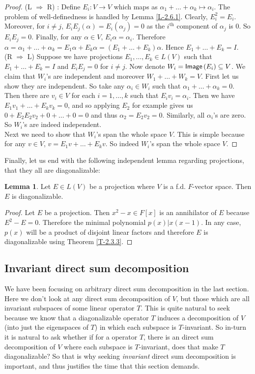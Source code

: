 \documentclass[letterpaper,11pt,twoside]{article}
\theoremstyle{definition}
\theoremstyle{definition}
\theoremstyle{definition}
\theoremstyle{definition}
\newtheorem{lemma}[proposition]{\textbf{Lemma}}
\theoremstyle{definition}
\theoremstyle{definition}
\theoremstyle{remark}
\theoremstyle{definition}
\newcommand{\Image}[1]{{\fontfamily{lmss}\selectfont 
		\text{Image}\left (#1\right )
}}
\begin{document}
    \begin{proof}
    (L $\Rightarrow$ R) : Define $E_i : V\to V$ which maps as $\alpha_1 + \dots + \alpha_k \mapsto \alpha_i$. The problem of well-definedness is handled by Lemma \ref{L-2.6.1}. Clearly, $E_i^2 = E_i$. Moreover, for $i\neq j$, $E_iE_j (\alpha) = E_i(\alpha_j) = 0$ as the $i^\text{th}$ component of $\alpha_j$ is $0$. So $E_iE_j = 0$. Finally, for any $\alpha\in V$, $E_i \alpha = \alpha_i$. Therefore $\alpha = \alpha_1 + \dots + \alpha_k = E_1\alpha + E_k \alpha = (E_1 + \dots + E_k)\alpha$. Hence $E_1 + \dots +E_k = I$.\\
    
    (R $\Rightarrow$ L) Suppose we have projections $E_1,\dots, E_k\in L(V)$ such that $E_1 + \dots +E_k = I$ and $E_iE_j = 0$ for $i\neq j$. Now denote $W_i = \Image{E_i} \subseteq V$. We claim that $W_i$'s are independent and moreover $W_1 + \dots + W_k = V$. First let us show they are independent. So take any $\alpha_i \in W_i$ such that $\alpha_1 + \dots + \alpha_k = 0$. Then there are $v_i \in V$ for each $i=1,\dots,k$ such that $E_i v_i = \alpha_i$. Then we have $E_1v_1 + \dots +E_kv_k = 0$, and so applying $E_2$ for example gives us $0 + E_2E_2v_2 + 0+ \dots +0 = 0$ and thus $\alpha_2 = E_2 v_2 = 0$. Similarly, all $\alpha_i$'s are zero. So $W_i$'s are indeed independent. \\
    Next we need to show that $W_i$'s span the whole space $V$. This is simple because for any $v\in V$, $v = E_1v + \dots +E_k v$. So indeed $W_i$'s span the whole space $V$.
    \end{proof}
    Finally, let us end with the following independent lemma regarding projections, that they all are diagonalizable:
    \begin{lemma}
    Let $E\in L(V)$ be a projection where $V$ is a f.d. $F$-vector space. Then $E$ is diagonalizable.
    \end{lemma}
\begin{proof}
    Let $E$ be a projection. Then $x^2-x \in F[x]$ is an annihilator of $E$ because $E^2-E = 0$. Therefore the minimal polynomial $p(x) | x(x-1)$. In any case, $p(x)$ will be a product of disjoint linear factors and therefore $E$ is diagonalizable using Theorem \ref{T-2.3.3}.
\end{proof}
    \subsection{Invariant direct sum decomposition}
    We have been focusing on arbitrary direct sum decomposition in the last section. Here we don't look at any direct sum decomposition of $V$, but those which are all invariant subspaces of some linear operator $T$. This is quite natural to seek because we know that a diagonalizable operator $T$ induces a decomposition of $V$ (into just the eigenspaces of $T$) in which each subspace is $T$-invariant. So in-turn it is natural to ask whether if for a operator $T$, there is an direct sum decomposition of $V$ where each subspace is $T$-invariant, does that make $T$ diagonalizable? So that is why seeking \textit{invariant} direct sum decomposition is important, and thus justifies the time that this section demands.\\
    
\end{document}
